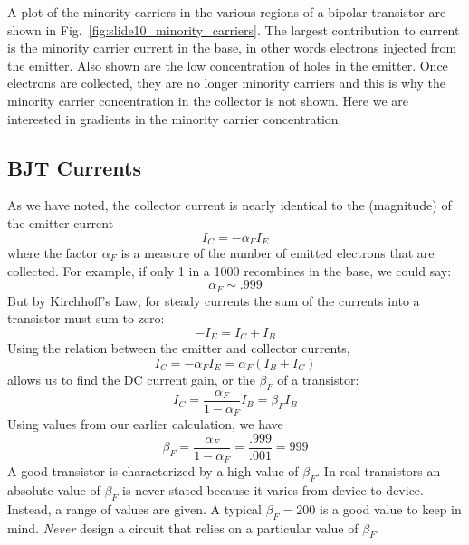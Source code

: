 A plot of the minority carriers in the various regions of a bipolar transistor are shown in Fig.~\ref{fig:slide10_minority_carriers}.  The largest contribution to current is the minority carrier current in the base, in other words electrons injected from the emitter.  Also shown are the low concentration of holes in the emitter.  Once electrons are collected, they are no longer minority carriers and this is why the minority carrier concentration in the collector is not shown.  Here we are interested in gradients in the minority carrier concentration.

\subsection{BJT Currents}

As we have noted, the collector current is nearly identical to the (magnitude) of the emitter current 
%
\begin{equation}
	{I_C} =  - {\alpha_F}{I_E}
\end{equation}
where the factor $\alpha_F$  is a measure of the number of emitted electrons that are collected.  For example, if only 1 in a 1000 recombines in the base, we could say:
%
\begin{equation}
	{\alpha _F} \sim .999
\end{equation}
But by Kirchhoff's Law, for steady currents the sum of the currents into a transistor must sum to zero:
%
\begin{equation} 
	- {I_E} = {I_C} + {I_B}
\end{equation}
%
Using the relation between the emitter and collector currents,
\begin{equation}
	{I_C} =  - {\alpha _F}{I_E} = {\alpha _F}({I_B} + {I_C})
\end{equation}
%
allows us to find the DC current gain, or the $\beta_F$ of a transistor:
%
\begin{equation}
	{I_C} = \frac{{{\alpha _F}}}{{1 - {\alpha _F}}}{I_B} = {\beta _F}{I_B}
\end{equation}
Using values from our earlier calculation, we have
%
\begin{equation}
	{\beta _F} = \frac{{{\alpha _F}}}{{1 - {\alpha _F}}} = \frac{{.999}}{{.001}} = 999
\end{equation}
%
A good transistor is characterized by a high value of $\beta_F$.  In real transistors an absolute value of $\beta_F$ is never stated because it varies from device to device.  Instead, a range of values are given.  A typical $\beta_F =200$ is a good value to keep in mind. \emph{Never} design a circuit that relies on a particular value of $\beta_F$.  

